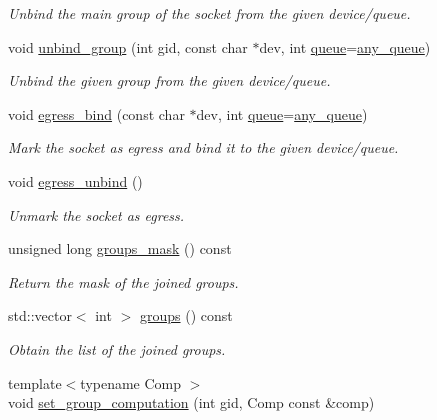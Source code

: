 \begin{DoxyCompactItemize}
\begin{DoxyCompactList}\small\item\em Unbind the main group of the socket from the given device/queue. \end{DoxyCompactList}\item 
void \hyperlink{classnet_1_1pfq_a3bbc9de1354d5cd3e99804e55618a1a3}{unbind\+\_\+group} (int gid, const char $\ast$dev, int \hyperlink{classnet_1_1queue}{queue}=\hyperlink{classnet_1_1pfq_a0d4eca6d0925b7c49365675c9cf9385c}{any\+\_\+queue})
\begin{DoxyCompactList}\small\item\em Unbind the given group from the given device/queue. \end{DoxyCompactList}\item 
void \hyperlink{classnet_1_1pfq_a11876a8bed5ed5a1e5fbcd7693a6242f}{egress\+\_\+bind} (const char $\ast$dev, int \hyperlink{classnet_1_1queue}{queue}=\hyperlink{classnet_1_1pfq_a0d4eca6d0925b7c49365675c9cf9385c}{any\+\_\+queue})
\begin{DoxyCompactList}\small\item\em Mark the socket as egress and bind it to the given device/queue. \end{DoxyCompactList}\item 
void \hyperlink{classnet_1_1pfq_a4e6a0213b89dfd4f32a5b47607b5ea52}{egress\+\_\+unbind} ()
\begin{DoxyCompactList}\small\item\em Unmark the socket as egress. \end{DoxyCompactList}\item 
unsigned long \hyperlink{classnet_1_1pfq_a37b9270cf29bb67a4b4e577646b39a78}{groups\+\_\+mask} () const 
\begin{DoxyCompactList}\small\item\em Return the mask of the joined groups. \end{DoxyCompactList}\item 
std\+::vector$<$ int $>$ \hyperlink{classnet_1_1pfq_af63de1f94a492284cfed78695f2e93ec}{groups} () const 
\begin{DoxyCompactList}\small\item\em Obtain the list of the joined groups. \end{DoxyCompactList}\item 
{\footnotesize template$<$typename Comp $>$ }\\void \hyperlink{classnet_1_1pfq_af434441b7c824c81e3888f771b70e023}{set\+\_\+group\+\_\+computation} (int gid, Comp const \&comp)

\end{DoxyCompactItemize}
